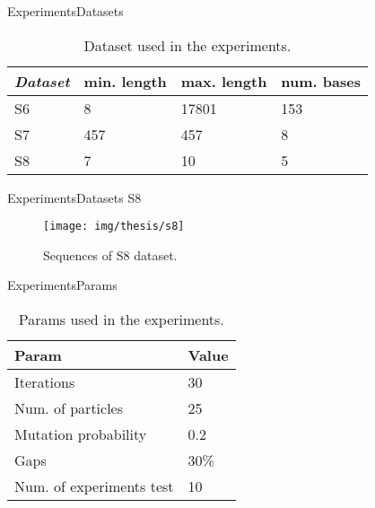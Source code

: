 \documentclass[10pt]{beamer}
\newcommand{\1}{
        	\setbeamertemplate{background}{
        		\texttt{[image: img/1]}
        		\tikz[overlay] \fill[fill opacity=0.75,fill=white] (0,0) rectangle (-\paperwidth,\paperheight);
        	}
}
\begin{document}
\begin{frame}{Experiments}{Datasets}
	\begin{table}[h]
		\centering
		\caption{Dataset used in the experiments.}
		\begin{tabular}{p{2cm}p{2cm}p{2cm}p{2cm}}
			
			\textbf{\textit{Dataset}} & \textbf{min. length} & \textbf{max. length} & \textbf{num. bases}\\
			\hline				
			S6  &  8 & 17801 & 153\\
			S7  &  457 & 457 & 8\\
			S8  &  7 & 10 & 5\\
			\hline 
		\end{tabular}		
		\label{tab:datasets2}
	\end{table}
\end{frame}

\begin{frame}{Experiments}{Datasets S8}
	\begin{figure}[h]
		\centering
		\texttt{[image: img/thesis/s8]}
		\caption{Sequences of S8 dataset.}
		\label{fig:s8}
	\end{figure}
\end{frame}

\begin{frame}{Experiments}{Params}
	\begin{table}[h]
		\centering
		\caption{Params used in the experiments.}
		\begin{tabular}{p{5cm}p{2cm}}
			
			\textbf{Param} & \textbf{Value} \\
			\hline			
			Iterations	& 30		\\				
			Num. of particles & 25 \\
			Mutation probability & 0.2 \\ 
			Gaps & 30\% \\	
			Num. of experiments test & 10 \\		
			\hline 
		\end{tabular}		
		\label{tab:param}
	\end{table}
\end{frame}
\end{document}
